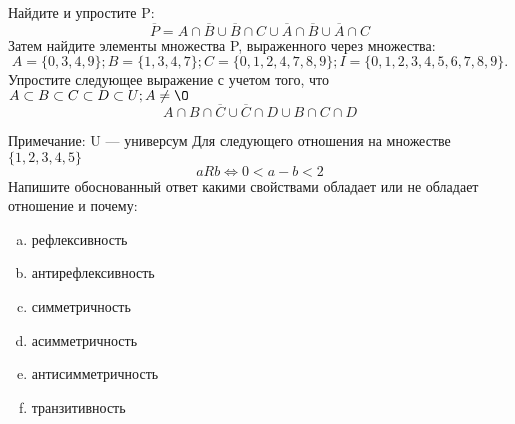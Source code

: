 \documentclass[10pt]{exam}
\begin{document}
\begin{questions}
\question
Найдите и упростите P:
\begin{equation*}
\overline{P} = A \cap \overline{B} \cup \overline{B} \cap C \cup \overline{A} \cap \overline{B} \cup \overline{A} \cap C
\end{equation*}
Затем найдите элементы множества P, выраженного через множества:
\begin{equation*}
A = \{0, 3, 4, 9\}; 
B = \{1, 3, 4, 7\};
C = \{0, 1, 2, 4, 7, 8, 9\};
I = \{0, 1, 2, 3, 4, 5, 6, 7, 8, 9\}.
\end{equation*}\question
Упростите следующее выражение с учетом того, что $A\subset B \subset C \subset D \subset U; A \neq \O$
\begin{equation*}
A \cap B  \cap \overline{C} \cup \overline{C} \cap D \cup B \cap C \cap D
\end{equation*}

Примечание: U — универсум\question
Для следующего отношения на множестве $\{1, 2, 3, 4, 5\}$ 
\begin{equation*}
aRb \iff 0 < a-b<2
\end{equation*}
Напишите обоснованный ответ какими свойствами обладает или не обладает отношение и почему:   
\begin{enumerate} [a)]\setcounter{enumi}{0}
\item рефлексивность
\item антирефлексивность
\item симметричность
\item асимметричность
\item антисимметричность
\item транзитивность
\end{enumerate}


\end{questions}
\end{document}
